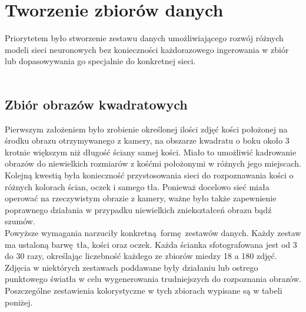 
\chapter{Tworzenie zbiorów danych}
Priorytetem było stworzenie zestawu danych
umożliwiającego rozwój różnych modeli sieci neuronowych bez konieczności każdorazowego
ingerowania w zbiór lub dopasowywania go specjalnie do konkretnej sieci.\\\\

\section{Zbiór obrazów kwadratowych}
Pierwszym założeniem było zrobienie określonej ilości zdjęć kości położonej na środku
obrazu otrzymywanego z kamery, na obszarze kwadratu o boku około 3 krotnie większym
niż długość ściany samej kości. Miało to umożliwić kadrowanie obrazów
do niewielkich rozmiarów z kośćmi położonymi w różnych jego miejscach.\\
Kolejną kwestią była konieczność przystosowania sieci do rozpoznawania kości o
różnych kolorach ścian, oczek i samego tła. Ponieważ docelowo sieć
miała operować na rzeczywistym obrazie z kamery, ważne było także zapewnienie poprawnego
działania w przypadku niewielkich zniekształceń obrazu bądź szumów.\\
Powyższe wymagania narzuciły konkretną formę zestawów danych.
Każdy zestaw ma ustaloną barwę tła, kości oraz oczek. Każda ścianka sfotografowana jest
od 3 do 30 razy, określając liczebność każdego ze zbiorów miedzy 18 a 180 zdjęć.
Zdjęcia w niektórych zestawach poddawane były działaniu lub ostrego punktowego światła
w celu wygenerowania trudniejszych do rozpoznania obrazów. Poszczególne zestawienia
kolorystyczne w tych zbiorach wypisane są w tabeli poniżej. \newpage

